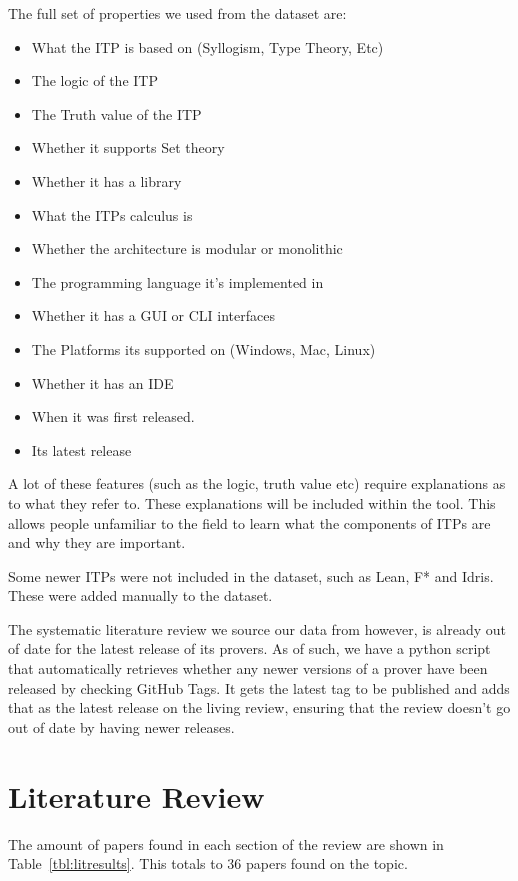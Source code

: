 \documentclass[
]{article}
\providecommand{\tightlist}{%
  \setlength{\itemsep}{0pt}\setlength{\parskip}{0pt}}
\begin{document}
The full set of properties we used from the dataset are:

\begin{itemize}
\tightlist
\item
  What the ITP is based on (Syllogism, Type Theory, Etc)
\item
  The logic of the ITP
\item
  The Truth value of the ITP
\item
  Whether it supports Set theory
\item
  Whether it has a library
\item
  What the ITPs calculus is
\item
  Whether the architecture is modular or monolithic
\item
  The programming language it's implemented in
\item
  Whether it has a GUI or CLI interfaces
\item
  The Platforms its supported on (Windows, Mac, Linux)
\item
  Whether it has an IDE
\item
  When it was first released.
\item
  Its latest release
\end{itemize}

A lot of these features (such as the logic, truth value etc) require
explanations as to what they refer to. These explanations will be
included within the tool. This allows people unfamiliar to the field to
learn what the components of ITPs are and why they are important.

Some newer ITPs were not included in the dataset, such as Lean, F* and
Idris. These were added manually to the dataset.

The systematic literature review we source our data from however, is
already out of date for the latest release of its provers. As of such,
we have a python script that automatically retrieves whether any newer
versions of a prover have been released by checking GitHub Tags. It gets
the latest tag to be published and adds that as the latest release on
the living review, ensuring that the review doesn't go out of date by
having newer releases.

\hypertarget{sec:literature_review}{%
\section{Literature Review}\label{sec:literature_review}}

The amount of papers found in each section of the review are shown in
Table~\ref{tbl:litresults}. This totals to 36 papers found on the topic.
\end{document}
